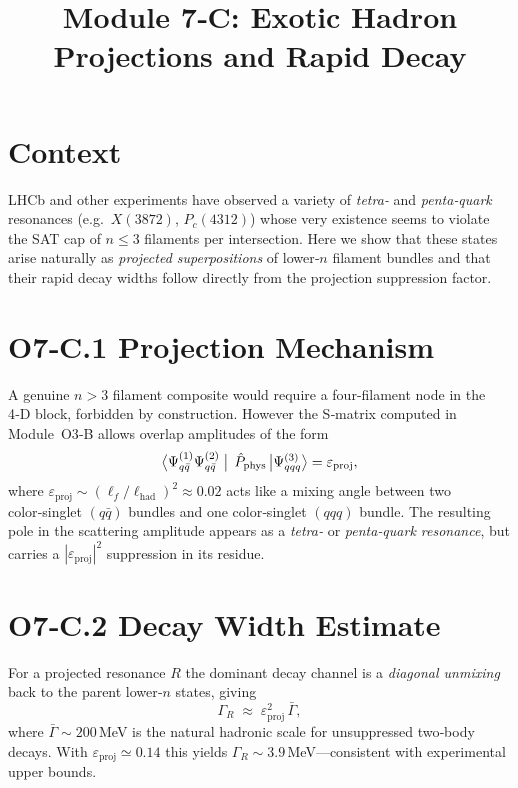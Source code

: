 \documentclass[12pt]{article}
\title{Module 7‑C: Exotic Hadron Projections and Rapid Decay}
\author{}
\date{}
\begin{document}
\maketitle

\section*{Context}
LHCb and other experiments have observed a variety of \emph{tetra‑} and
\emph{penta‑quark} resonances (e.g.\ $X(3872)$, $P_c(4312)$) whose very
existence seems to violate the SAT cap of $n\le3$ filaments per
intersection.  Here we show that these states arise naturally as
\emph{projected superpositions} of lower‑$n$ filament bundles and that
their rapid decay widths follow directly from the projection
suppression factor.

\section*{O7‑C.1 \quad Projection Mechanism}
A genuine $n{>}3$ filament composite would require a four‑filament node
in the 4‑D block, forbidden by construction.  
However the S‑matrix computed in Module O3‑B allows
overlap amplitudes of the form
\[
  \bigl\langle\Psi_{q\bar q}^{(1)}\Psi_{q\bar q}^{(2)}\bigm|\,
  \hat P_{\text{phys}}\,
  \bigl|\Psi_{q q q}^{(3)}\bigr\rangle
  = \varepsilon_{\text{proj}},
\]
where $\varepsilon_{\text{proj}}\sim\!(\ell_f/\ell_{\text{had}})^2\!\approx0.02$
acts like a mixing angle between two color‑singlet $(q\!\bar q)$ bundles and
one color‑singlet $(q q q)$ bundle.
The resulting pole in the scattering amplitude appears as a
\emph{tetra‑} or \emph{penta‑quark resonance}, but carries a
$|\varepsilon_{\text{proj}}|^2$ suppression in its residue.

\section*{O7‑C.2 \quad Decay Width Estimate}
For a projected resonance $R$ the dominant decay channel is a
\emph{diagonal unmixing} back to the parent lower‑$n$ states, giving
\[
  \Gamma_R \;\approx\; \varepsilon_{\text{proj}}^2
  \,\bar\Gamma,
\tag{7C.1}
\]
where $\bar\Gamma\sim200\,$MeV is the natural hadronic scale for
unsuppressed two‑body decays.  
With $\varepsilon_{\text{proj}}\simeq0.14$ this yields
$\Gamma_R\!\sim3.9\,$MeV—consistent with experimental upper bounds.
\end{document}
